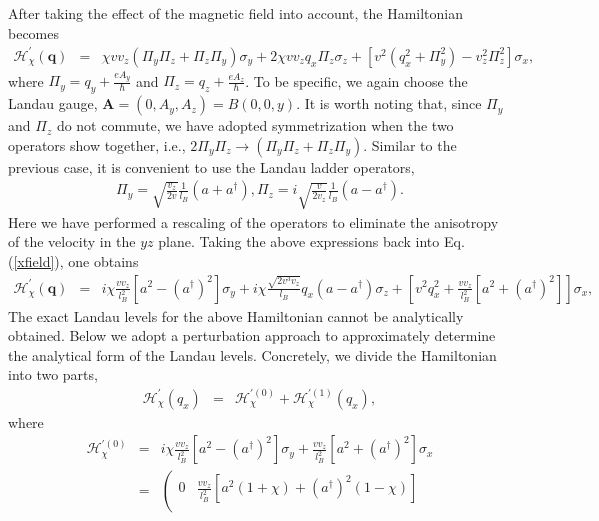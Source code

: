 \documentclass[aps,prl,twocolumn,longbibliography]{revtex4-1}
\newcommand{\bq}{\boldsymbol q}
\newcommand{\bA}{\boldsymbol{A}}
\begin{document}
\begin{widetext}
After taking the effect of the magnetic field into account, the Hamiltonian becomes
\begin{eqnarray}
	\mathcal{H}_{\chi}^{'}(\bq)
	&=&\chi vv_{z}(\Pi_{y}\Pi_{z}+\Pi_{z}\Pi_{y})\sigma_{y}+2\chi vv_{z}q_{x}\Pi_{z}\sigma_{z}+\left[v^{2}(q_{x}^{2}+\Pi_{y}^{2})-v_{z}^{2}\Pi_{z}^{2}\right]\sigma_{x},\label{xfield}
\end{eqnarray}
where $\Pi_{y}=q_{y}+\frac{eA_{y}}{\hbar}$ and $\Pi_{z}=q_{z}+\frac{eA_{z}}{\hbar}$. To be specific, we
again choose the Landau gauge, $\bA=(0,A_{y},A_{z})=B(0,0,y)$. It is worth noting that, since
$\Pi_{y}$ and $\Pi_{z}$ do not commute, we have adopted symmetrization when the two operators
show together, i.e., $2\Pi_{y}\Pi_{z}\rightarrow(\Pi_{y}\Pi_{z}+\Pi_{z}\Pi_{y})$.  Similar to
the previous case, it is convenient to use the Landau ladder operators,
\begin{eqnarray}
	\Pi_{y}=\sqrt{\frac{v_{z}}{2v}}\frac{1}{l_{B}}(a+a^{\dagger}), \Pi_{z}=i\sqrt{\frac{v}{2v_{z}}}\frac{1}{l_{B}}(a-a^{\dagger}).
\end{eqnarray}
Here we have performed a rescaling of the operators to eliminate the anisotropy of the velocity in the $yz$ plane.
Taking the above expressions back into Eq.(\ref{xfield}), one obtains
\begin{eqnarray}
\mathcal{H}_{\chi}^{'}(\bq)
	&=&i\chi \frac{vv_{z}}{l_{B}^{2}}[a^{2}-(a^\dag)^{2}]\sigma_{y}+i\chi\frac{\sqrt{2 v^{3}v_{z}}}{l_{B}}q_{x}(a-a^{\dag})\sigma_{z}+\left[v^{2}q_{x}^{2}+\frac{vv_{z}}{l_{B}^{2}}[a^{2}+(a^{\dag})^{2}]\right]\sigma_{x},
\end{eqnarray}
The exact Landau levels for the above Hamiltonian cannot be analytically obtained. Below we adopt a
perturbation approach to approximately determine the analytical form of the Landau levels.  Concretely, we divide the
Hamiltonian into two parts,
\begin{eqnarray}
	\mathcal{H}_{\chi}^{'}(q_{x})&=&\mathcal{H}_{\chi}^{'(0)}+\mathcal{H}_{\chi}^{'(1)}(q_{x}),
	\label{eq: Hlow_Bx}
\end{eqnarray}
where
\begin{eqnarray}
	\mathcal{H}_{\chi}^{'(0)}&=&i\chi\frac{vv_{z}}{l_{B}^{2}}\left[a^{2}-(a^{\dagger})^{2}\right]\sigma_{y}+\frac{vv_{z}}{l_{B}^{2}}\left[a^{2}+(a^{\dagger})^{2}\right]\sigma_{x}\nonumber\\
	&=&\left(\begin{array}{cc}
		0 & \frac{vv_{z}}{l_{B}^{2}}\left[a^{2}(1+\chi)+(a^{\dagger})^{2}(1-\chi)\right]\\

\end{array}
\end{eqnarray}
\end{widetext}
\end{document}
